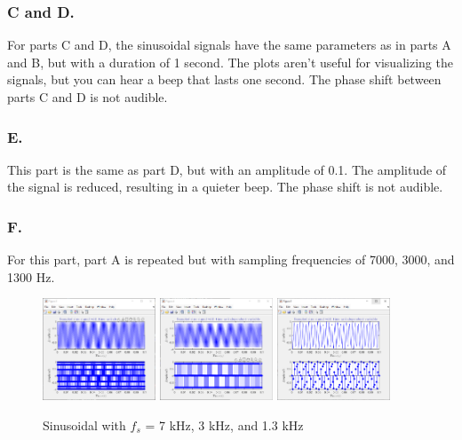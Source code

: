 \documentclass[12pt]{article}
\begin{document}
\subsubsection*{C and D.}
For parts C and D, the sinusoidal signals have the same parameters as in parts A and B,
but with a duration of 1 second. The plots aren't useful for visualizing the signals,
but you can hear a beep that lasts one second. The phase shift between parts C and D
is not audible.


\subsubsection*{E.}
This part is the same as part D, but with an amplitude of 0.1. The amplitude of the
signal is reduced, resulting in a quieter beep. The phase shift is not audible.

\subsubsection*{F.}
For this part, part A is repeated but with sampling frequencies of 7000, 3000, and 
1300 Hz. 
\begin{figure}[H]
	\centering
	\includegraphics[width=0.3\textwidth]{fig 1f 7000.png}\hfill
	\includegraphics[width=0.3\textwidth]{fig 1f 3000.png}\hfill
	\includegraphics[width=0.3\textwidth]{fig 1f 1300.png}
	\caption{Sinusoidal with $f_s$ = 7 kHz, 3 kHz, and 1.3 kHz}
	\label{fig:fig3}
\end{figure}
\end{document}
